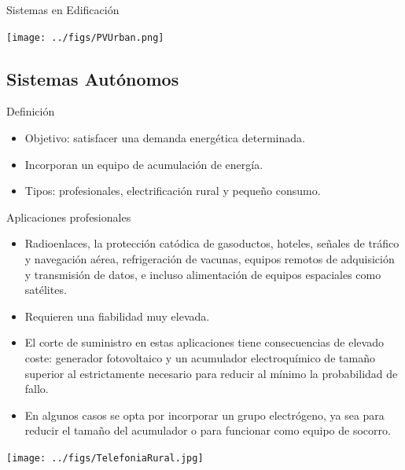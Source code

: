 \documentclass[xcolor={usenames,svgnames,dvipsnames}]{beamer}
\begin{document}
\begin{frame}[label={sec:orgc8dc029}]{Sistemas en Edificación}
\begin{center}
\texttt{[image: ../figs/PVUrban.png]}
\end{center}
\end{frame}

\subsection{Sistemas Autónomos}
\label{sec:orgb339b2d}
\begin{frame}[label={sec:org4aaff4b}]{Definición}
\begin{itemize}
\item Objetivo: satisfacer una demanda energética determinada.

\item Incorporan un equipo de acumulación de energía.

\item Tipos: profesionales, electrificación rural y pequeño consumo.
\end{itemize}
\end{frame}

\begin{frame}[label={sec:orgd19f691}]{Aplicaciones profesionales}
\begin{itemize}
\item Radioenlaces, la protección catódica de gasoductos, hoteles, señales
de tráfico y navegación aérea, refrigeración de vacunas, equipos
remotos de adquisición y transmisión de datos, e incluso
alimentación de equipos espaciales como satélites.

\item Requieren una fiabilidad muy elevada.

\item El corte de suministro en estas aplicaciones tiene consecuencias de
elevado coste: generador fotovoltaico y un acumulador electroquímico
de tamaño superior al estrictamente necesario para reducir al mínimo
la probabilidad de fallo.

\item En algunos casos se opta por incorporar un grupo electrógeno, ya sea
para reducir el tamaño del acumulador o para funcionar como equipo
de socorro.
\end{itemize}
\end{frame}

\begin{frame}[label={sec:org55f3beb}]{}
\begin{center}
\texttt{[image: ../figs/TelefoniaRural.jpg]}
\end{center}
\end{frame}
\end{document}
